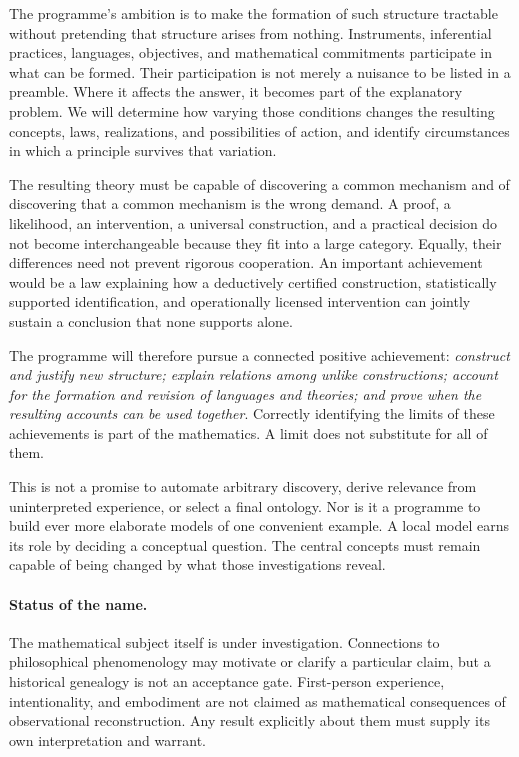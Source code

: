 \documentclass[11pt]{article}
\theoremstyle{definition}
\begin{document}
The programme's ambition is to make the formation of such structure tractable without pretending that structure arises from nothing. Instruments, inferential practices, languages, objectives, and mathematical commitments participate in what can be formed. Their participation is not merely a nuisance to be listed in a preamble. Where it affects the answer, it becomes part of the explanatory problem. We will determine how varying those conditions changes the resulting concepts, laws, realizations, and possibilities of action, and identify circumstances in which a principle survives that variation.

The resulting theory must be capable of discovering a common mechanism and of discovering that a common mechanism is the wrong demand. A proof, a likelihood, an intervention, a universal construction, and a practical decision do not become interchangeable because they fit into a large category. Equally, their differences need not prevent rigorous cooperation. An important achievement would be a law explaining how a deductively certified construction, statistically supported identification, and operationally licensed intervention can jointly sustain a conclusion that none supports alone.

The programme will therefore pursue a connected positive achievement: \emph{construct and justify new structure; explain relations among unlike constructions; account for the formation and revision of languages and theories; and prove when the resulting accounts can be used together}. Correctly identifying the limits of these achievements is part of the mathematics. A limit does not substitute for all of them.

This is not a promise to automate arbitrary discovery, derive relevance from uninterpreted experience, or select a final ontology. Nor is it a programme to build ever more elaborate models of one convenient example. A local model earns its role by deciding a conceptual question. The central concepts must remain capable of being changed by what those investigations reveal.

\paragraph{Status of the name.}
The mathematical subject itself is under investigation. Connections to philosophical phenomenology may motivate or clarify a particular claim, but a historical genealogy is not an acceptance gate. First-person experience, intentionality, and embodiment are not claimed as mathematical consequences of observational reconstruction. Any result explicitly about them must supply its own interpretation and warrant.
\end{document}
